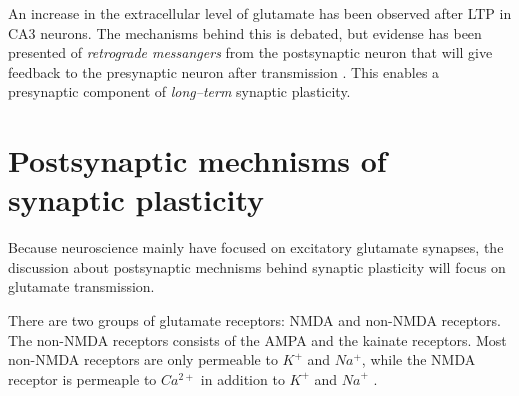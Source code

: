 

An increase in the extracellular level of glutamate has been observed after LTP in CA3 neurons. 
The mechanisms behind this is debated, but evidense has been presented of \emph{retrograde messangers} from the postsynaptic neuron that will 
	give feedback to the presynaptic neuron after transmission \cite{PrinciplesOfNeuralScience4edKAP63}. 
This enables a  presynaptic component of \emph{long--term} synaptic plasticity.








\section{Postsynaptic mechnisms of synaptic plasticity}
Because neuroscience mainly have focused on excitatory glutamate synapses, the discussion about postsynaptic mechnisms behind synaptic plasticity will focus on glutamate transmission.

There are two groups of glutamate receptors: NMDA and non-NMDA receptors. 
The non-NMDA receptors consists of the AMPA and the kainate receptors. 
Most non-NMDA receptors are only permeable to $K^+$ and $Na^+$, while the NMDA receptor is permeaple to $Ca^{2+}$ in addition to $K^+$ and ${Na}^+$ \cite{PrinciplesOfNeuralScience4edKAP12}. 


